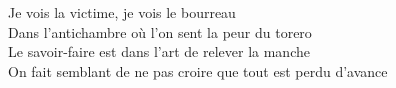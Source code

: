 Je vois la victime, je vois le bourreau \\
Dans l'antichambre où l'on sent la peur du torero \\
Le savoir-faire est dans l'art de relever la manche \\
On fait semblant de ne pas croire que tout est perdu d'avance
